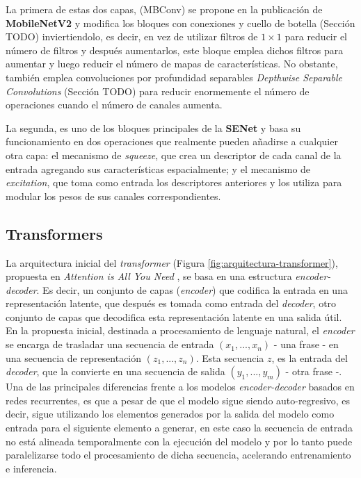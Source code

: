 La primera de estas dos capas, (MBConv) se propone en la publicación de \textbf{MobileNetV2} \cite{mobilenetv2} y modifica los bloques con conexiones y cuello de botella (Sección TODO) inviertiendolo, es decir, en vez de utilizar filtros de $1\times1$ para reducir el número de filtros y después aumentarlos, este bloque emplea dichos filtros para aumentar y luego reducir el número de mapas de características. No obstante, también emplea convoluciones por profundidad separables \textit{Depthwise Separable Convolutions} (Sección TODO) para reducir enormemente el número de operaciones cuando el número de canales aumenta. 

La segunda, es uno de los bloques principales de la \textbf{SENet} \cite{} y basa su funcionamiento en dos operaciones que realmente pueden añadirse a cualquier otra capa: el mecanismo de \textit{squeeze}, que crea un descriptor de cada canal de la entrada agregando sus características espacialmente; y el mecanismo de \textit{excitation}, que toma como entrada los descriptores anteriores y los utiliza para modular los pesos de sus canales correspondientes.

\subsection{Transformers}
La arquitectura inicial del \textit{transformer} (Figura \ref{fig:arquitectura-transformer}), propuesta en \textit{Attention is All You Need} \cite{NIPS2017_3f5ee243}, se basa en una estructura \textit{encoder-decoder}. Es decir, un conjunto de capas (\textit{encoder}) que codifica la entrada en una representación latente, que después es tomada como entrada del \textit{decoder}, otro conjunto de capas que decodifica esta representación latente en una salida útil. En la propuesta inicial, destinada a procesamiento de lenguaje natural, el \textit{encoder} se encarga de trasladar una secuencia de entrada $(x_1, ..., x_n)$ - una frase - en una secuencia de representación $(z_1, ..., z_n)$. Esta secuencia $z$, es la entrada del \textit{decoder}, que la convierte en una secuencia de salida $(y_1, ..., y_m)$ - otra frase -. Una de las principales diferencias frente a los modelos \textit{encoder-decoder} basados en redes recurrentes, es que a pesar de que el modelo sigue siendo auto-regresivo, es decir, sigue utilizando los elementos generados por la salida del modelo como entrada para el siguiente elemento a generar, en este caso la secuencia de entrada no está alineada temporalmente con la ejecución del modelo y por lo tanto puede paralelizarse todo el procesamiento de dicha secuencia, acelerando entrenamiento e inferencia.

